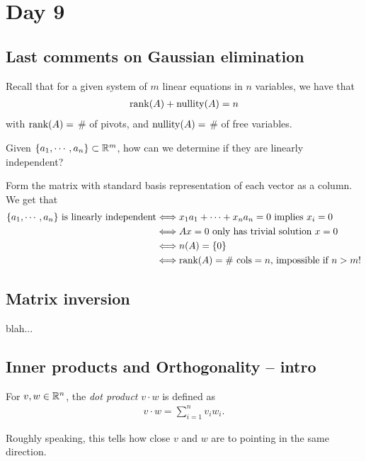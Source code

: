 
\pagebreak
\section{Day 9}

\subsection{Last comments on Gaussian elimination}

Recall that for a given system of $m$ linear equations in $n$ variables, we have that
\begin{align*}
  \operatorname{rank}(A) + \operatorname{nullity}(A) = n
\end{align*}
with $\operatorname{rank}(A)=$ \# of pivots, and $\operatorname{nullity}(A)=$ \# of free variables.

\begin{question}
  Given $\{a_1,\cdots,a_n\}\subset\mathbb{R}^m$, how can we determine if they are linearly independent?
\end{question}
\begin{answer}
  Form the matrix with standard basis representation of each vector as a column. We get that
  \begin{align*}
    \{a_1,\cdots,a_n\} \text{ is linearly independent} &\Longleftrightarrow x_1a_1 + \cdots + x_na_n = 0 \text{ implies } x_i=0\\
    &\Longleftrightarrow Ax=0 \text{ only has trivial solution } x=0\\
    &\Longleftrightarrow n(A)=\{0\}\\
    &\Longleftrightarrow \operatorname{rank}(A)=\text{\# cols}=n \text{, impossible if $n>m$!}
  \end{align*}
\end{answer}



\subsection{Matrix inversion}

blah...


\subsection{Inner products and Orthogonality -- intro}

\begin{definition}
  For $v,w\in\mathbb{R}^n$, the \emph{dot product} $v\cdot w$ is defined as
  \begin{align*}
    v\cdot w = \sum_{i=1}^n v_iw_i.
  \end{align*}

  Roughly speaking, this tells how close $v$ and $w$ are to pointing in the same direction.
\end{definition}

